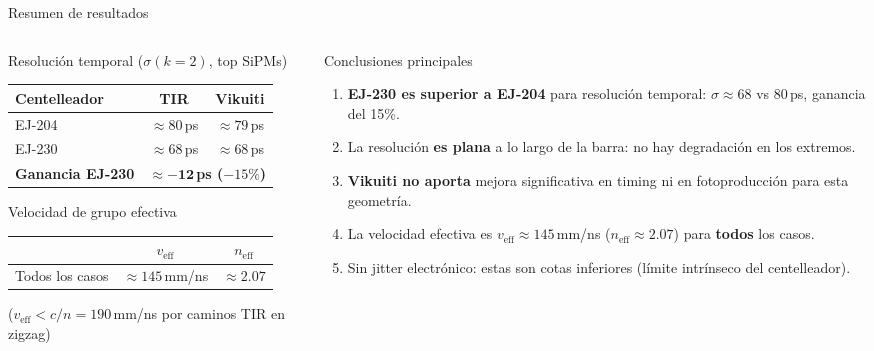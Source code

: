 \documentclass[aspectratio=169,10pt]{beamer}
\begin{document}
\begin{frame}{Resumen de resultados}

\begin{columns}[T]
  \begin{column}{0.52\textwidth}
  \footnotesize
  \begin{block}{Resolución temporal ($\sigma(k=2)$, top SiPMs)}
    \begin{tabular}{@{}lcc@{}}
      \toprule
      Centelleador & TIR & Vikuiti \\
      \midrule
      \color{ej204col}EJ-204 & $\approx80$\,ps & $\approx79$\,ps \\
      \color{ej230col}EJ-230 & $\approx68$\,ps & $\approx68$\,ps \\
      \midrule
      \textbf{Ganancia EJ-230} & \multicolumn{2}{c}{\textbf{$\boldsymbol{\approx-12}$\,ps ($-15\%$)}} \\
      \bottomrule
    \end{tabular}
  \end{block}

  \begin{block}{Velocidad de grupo efectiva}
    \begin{tabular}{@{}lcc@{}}
      \toprule
      & $v_\text{eff}$ & $n_\text{eff}$ \\
      \midrule
      Todos los casos & $\approx145$\,mm/ns & $\approx2.07$ \\
      \bottomrule
    \end{tabular}
    {\tiny ($v_\text{eff} < c/n = 190$\,mm/ns por caminos TIR en zigzag)}
  \end{block}
  \end{column}

  \begin{column}{0.46\textwidth}
  \footnotesize
  \begin{block}{Conclusiones principales}
  \begin{enumerate}
    \item \textbf{EJ-230 es superior a EJ-204} para resolución temporal:
          $\sigma \approx68$ vs $80$\,ps, ganancia del 15\%.
    \item La resolución \textbf{es plana} a lo largo de la barra:
          no hay degradación en los extremos.
    \item \textbf{Vikuiti no aporta} mejora significativa en timing
          ni en fotoproducción para esta geometría.
    \item La velocidad efectiva es $v_\text{eff}\approx145$\,mm/ns
          ($n_\text{eff}\approx2.07$) para \textbf{todos} los casos.
    \item Sin jitter electrónico: estas son cotas inferiores
          (límite intrínseco del centelleador).
  \end{enumerate}
  \end{block}
  \end{column}
\end{columns}


\end{frame}
\end{document}
